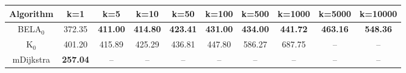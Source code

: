 \begin{tabular}{c|ccccccccc}\toprule
Algorithm & k=1 & k=5 & k=10 & k=50 & k=100 & k=500 & k=1000 & k=5000 & k=10000 \\ \midrule
BELA$_0$ & 372.35 & \textbf{411.00} & \textbf{414.80} & \textbf{423.41} & \textbf{431.00} & \textbf{434.00} & \textbf{441.72} & \textbf{463.16} & \textbf{548.36} \\
K$_0$ & 401.20 & 415.89 & 425.29 & 436.81 & 447.80 & 586.27 & 687.75 & -- & -- \\
mDijkstra & \textbf{257.04} & -- & -- & -- & -- & -- & -- & -- & -- \\ \bottomrule 
\end{tabular}

